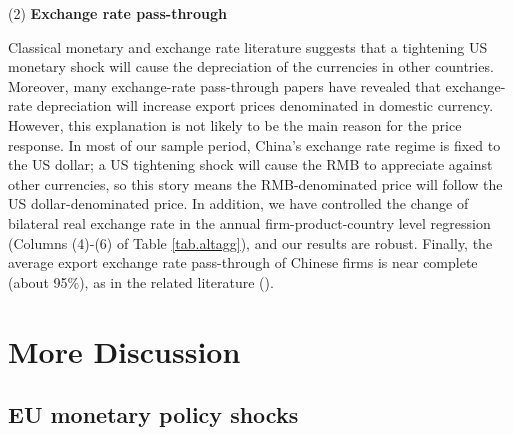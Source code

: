 (2) \textbf{Exchange rate pass-through} 

Classical monetary and exchange rate literature suggests that a tightening US monetary shock will cause the depreciation of the currencies in other countries. Moreover, many exchange-rate pass-through papers have revealed that exchange-rate depreciation will increase export prices denominated in domestic currency. However, this explanation is not likely to be the main reason for the price response. In most of our sample period, China's exchange rate regime is fixed to the US dollar; a US tightening shock will cause the RMB to appreciate against other currencies, so this story means the RMB-denominated price will follow the US dollar-denominated price. In addition, we have controlled the change of bilateral real exchange rate in the annual firm-product-country level regression (Columns (4)-(6) of Table \ref{tab.altagg}), and our results are robust. Finally, the average export exchange rate pass-through of Chinese firms is near complete (about 95\%), as in the related literature (\cite{li2015exchange}).

\newpage
\section{More Discussion}

\subsection{EU monetary policy shocks}

